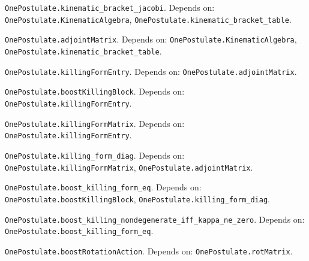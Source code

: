 \begin{lemma}\label{OnePostulate.kinematic_bracket_jacobi}
\texttt{OnePostulate.kinematic\_bracket\_jacobi}. Depends on: \texttt{OnePostulate.KinematicAlgebra}, \texttt{OnePostulate.kinematic\_bracket\_table}.
\end{lemma}

\begin{definition}\label{OnePostulate.adjointMatrix}
\texttt{OnePostulate.adjointMatrix}. Depends on: \texttt{OnePostulate.KinematicAlgebra}, \texttt{OnePostulate.kinematic\_bracket\_table}.
\end{definition}

\begin{definition}\label{OnePostulate.killingFormEntry}
\texttt{OnePostulate.killingFormEntry}. Depends on: \texttt{OnePostulate.adjointMatrix}.
\end{definition}

\begin{definition}\label{OnePostulate.boostKillingBlock}
\texttt{OnePostulate.boostKillingBlock}. Depends on: \texttt{OnePostulate.killingFormEntry}.
\end{definition}

\begin{definition}\label{OnePostulate.killingFormMatrix}
\texttt{OnePostulate.killingFormMatrix}. Depends on: \texttt{OnePostulate.killingFormEntry}.
\end{definition}

\begin{lemma}\label{OnePostulate.killing_form_diag}
\texttt{OnePostulate.killing\_form\_diag}. Depends on: \texttt{OnePostulate.killingFormMatrix}, \texttt{OnePostulate.adjointMatrix}.
\end{lemma}

\begin{lemma}\label{OnePostulate.boost_killing_form_eq}
\texttt{OnePostulate.boost\_killing\_form\_eq}. Depends on: \texttt{OnePostulate.boostKillingBlock}, \texttt{OnePostulate.killing\_form\_diag}.
\end{lemma}

\begin{lemma}\label{OnePostulate.boost_killing_nondegenerate_iff_kappa_ne_zero}
\texttt{OnePostulate.boost\_killing\_nondegenerate\_iff\_kappa\_ne\_zero}. Depends on: \texttt{OnePostulate.boost\_killing\_form\_eq}.
\end{lemma}

\begin{definition}\label{OnePostulate.boostRotationAction}
\texttt{OnePostulate.boostRotationAction}. Depends on: \texttt{OnePostulate.rotMatrix}.
\end{definition}

